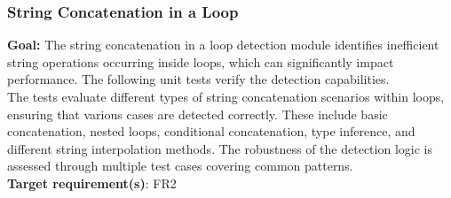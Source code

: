 \documentclass[12pt, titlepage]{article}
\begin{document}
\subsubsection{String Concatenation in a Loop}

\textbf{Goal:} The string concatenation in a loop detection module identifies inefficient string operations occurring inside loops, which can significantly impact performance. The following unit tests verify the detection capabilities.\\

\noindent The tests evaluate different types of string concatenation scenarios within loops, ensuring that various cases are detected correctly. These include basic concatenation, nested loops, conditional concatenation, type inference, and different string interpolation methods. The robustness of the detection logic is assessed through multiple test cases covering common patterns.\\

\noindent\textbf{Target requirement(s)}: FR2~\cite{SRS} \\
\end{document}
